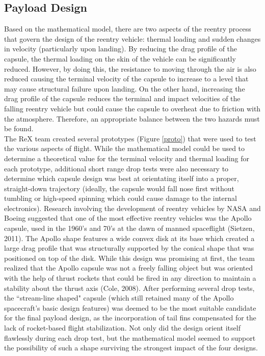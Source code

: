 \documentclass{article}
\begin{document}
\begin{doublespace}
	\subsection{Payload Design}
		\indent\indent Based on the mathematical model, there are two aspects of the reentry process that govern the design of the reentry vehicle: thermal loading and sudden changes in velocity (particularly upon landing). By reducing the drag profile of the capsule, the thermal loading on the skin of the vehicle can be significantly reduced. However, by doing this, the resistance to moving through the air is also reduced causing the terminal velocity of the capsule to increase to a level that may cause structural failure upon landing. On the other hand, increasing the drag profile of the capsule reduces the terminal and impact velocities of the falling reentry vehicle but could cause the capsule to overheat due to friction with the atmosphere. Therefore, an appropriate balance between the two hazards must be found.\\
		\indent The ReX team created several prototypes (Figure \ref{proto}) that were used to test the various aspects of flight. While the mathematical model could be used to determine a theoretical value for the terminal velocity and thermal loading for each prototype, additional short range drop tests were also necessary to determine which capsule design was best at orientating itself into a proper, straight-down trajectory (ideally, the capsule would fall nose first without tumbling or high-speed spinning which could cause damage to the internal electronics).  Research involving the development of reentry vehicles by NASA and Boeing suggested that one of the most effective reentry vehicles was the Apollo capsule, used in the 1960's and 70's at the dawn of manned spaceflight (Sietzen, 2011). The Apollo shape features a wide convex disk at its base which created a large drag profile that was structurally supported by the conical shape that was positioned on top of the disk. While this design was promising at first, the team realized that the Apollo capsule was not a freely falling object but was oriented with the help of thrust rockets that could be fired in any direction to maintain a stability about the thrust axis (Cole, 2008). After performing several drop tests, the ``stream-line shaped" capsule (which still retained many of the Apollo spacecraft's basic design features) was deemed to be the most suitable candidate for the final payload design, as the incorporation of tail fins compensated for the lack of rocket-based flight stabilization. Not only did the design orient itself flawlessly during each drop test, but the mathematical model seemed to support the possibility of such a shape surviving the strongest impact of the four designs.\\

\end{doublespace}
\end{document}
